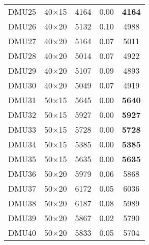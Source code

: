 \begin{table}[H]
\begin{tabular}{@{}ccccc@{}}
DMU25 & 40$\times$15 & 4164 & 0.00 & \textbf{4164}\\ 
DMU26 & 40$\times$20 & 5132 & 0.10 & 4988\\ 
DMU27 & 40$\times$20 & 5164 & 0.07 & 5011\\ 
DMU28 & 40$\times$20 & 5014 & 0.07 & 4922\\ 
DMU29 & 40$\times$20 & 5107 & 0.09 & 4893\\ 
DMU30 & 40$\times$20 & 5049 & 0.07 & 4919\\ 
DMU31 & 50$\times$15 & 5645 & 0.00 & \textbf{5640}\\ 
DMU32 & 50$\times$15 & 5927 & 0.00 & \textbf{5927}\\ 
DMU33 & 50$\times$15 & 5728 & 0.00 & \textbf{5728}\\ 
DMU34 & 50$\times$15 & 5385 & 0.00 & \textbf{5385}\\ 
DMU35 & 50$\times$15 & 5635 & 0.00 & \textbf{5635}\\ 
DMU36 & 50$\times$20 & 5979 & 0.06 & 5868\\ 
DMU37 & 50$\times$20 & 6172 & 0.05 & 6036\\ 
DMU38 & 50$\times$20 & 6187 & 0.08 & 5989\\ 
DMU39 & 50$\times$20 & 5867 & 0.02 & 5790\\ 
DMU40 & 50$\times$20 & 5833 & 0.05 & 5704\\ \bottomrule
\end{tabular}
\end{table}

